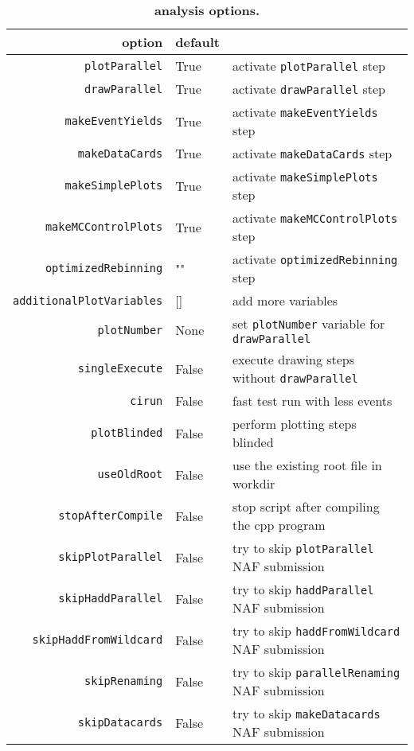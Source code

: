 \documentclass[12pt, a4paper]{article}
\begin{document}
\begin{table}[h]
\caption{\textbf{analysis options.}}\label{analysisOptions}
\begin{tabular}{r|ll}
option							& default & \\
\hline
\texttt{plotParallel} 			& True	& activate \texttt{plotParallel} step\\
\texttt{drawParallel}			& True	& activate \texttt{drawParallel} step\\
\texttt{makeEventYields}		& True	& activate \texttt{makeEventYields} step\\
\texttt{makeDataCards}			& True	& activate \texttt{makeDataCards} step\\
\texttt{makeSimplePlots}		& True	& activate \texttt{makeSimplePlots} step\\
\texttt{makeMCControlPlots}		& True	& activate \texttt{makeMCControlPlots} step\\
\texttt{optimizedRebinning}		& ""	& activate \texttt{optimizedRebinning} step\\
\hline
\texttt{additionalPlotVariables}& []	& add more variables\\
\texttt{plotNumber}				& None	& set \texttt{plotNumber} variable for 														\texttt{drawParallel}\\
\texttt{singleExecute}			& False	& execute drawing steps without																\texttt{drawParallel}\\
\texttt{cirun}					& False	& fast test run with less events\\
\texttt{plotBlinded}			& False	& perform plotting steps blinded\\
\texttt{useOldRoot}				& False	& use the existing root file in workdir\\
\texttt{stopAfterCompile}		& False	& stop script after compiling the cpp program\\
\hline
\texttt{skipPlotParallel}		& False	& try to skip \texttt{plotParallel} NAF submission\\
\texttt{skipHaddParallel}		& False	& try to skip \texttt{haddParallel} NAF submission\\
\texttt{skipHaddFromWildcard}	& False	& try to skip \texttt{haddFromWildcard} NAF submission\\
\texttt{skipRenaming}			& False	& try to skip \texttt{parallelRenaming} NAF submission\\
\texttt{skipDatacards}			& False	& try to skip \texttt{makeDatacards} NAF submission\\

\end{tabular}
\end{table}
\end{document}

